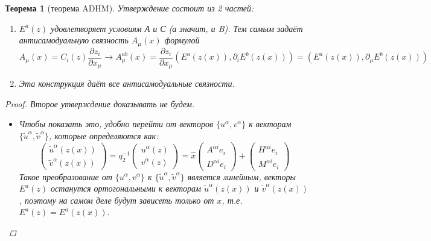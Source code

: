 \documentclass[12pt]{article}
\newtheorem{theorem}{Теорема}[section]
\theoremstyle{definition}
\begin{document}
\begin{theorem}[теорема ADHM]
    Утверждение состоит из 2 частей:
    \begin{enumerate}
        \item $E^{a}(z)$ удовлетворяет условиям А и С (а значит, и B). Тем самым задаёт антисамодуальную связность $A_\mu(x)$ формулой
        \begin{equation}
            A_\mu(x)=C_i(z)\frac{\partial z_i}{\partial x_\mu}\rightarrow A^{ab}_\mu(x)=\frac{\partial z_i}{\partial x_\mu}(E^a(z(x)),\partial_i E^b(z(x)))=(E^a(z(x)),\partial_\mu E^b(z(x)))
        \end{equation}
        \item Эта конструкция даёт все антисамодуальные связности.
    \end{enumerate}
    \begin{proof}
        Второе утверждение доказывать не будем.
        \begin{itemize}
            \item[A.] Чтобы показать это, удобно перейти от векторов $\{u^\alpha, v^\alpha\}$ к векторам $\{\tilde{u}^\alpha,\tilde{v}^\alpha\}$, которые определяются как:
            \begin{equation}
                \begin{pmatrix}
                    \tilde{u}^\alpha(z(x))\\
                    \tilde{v}^\alpha(z(x))
                \end{pmatrix}=q_2^{-1}\begin{pmatrix}
                    u^\alpha(z)\\
                    v^\alpha(z)
                \end{pmatrix}=\hat{x}\begin{pmatrix}
                    A^{\alpha i}e_i\\
                    D^{\alpha i}e_i
                \end{pmatrix}+\begin{pmatrix}
                    H^{\alpha i}e_i\\
                    M^{\alpha i}e_i
                \end{pmatrix}
            \end{equation}
            Такое преобразование от $\{u^\alpha, v^\alpha\}$ к $\{\tilde{u}^\alpha, \tilde{v}^\alpha\}$ является линейным, векторы $E^a(z)$ останутся ортогональными к векторам $\tilde{u}^\alpha(z(x))$ и $\tilde{v}^\alpha(z(x))$, поэтому на самом деле будут зависеть только от $x$, т.е. $E^a(z) = E^a(z(x))$.

\end{itemize}
\end{proof}
\end{theorem}
\end{document}
